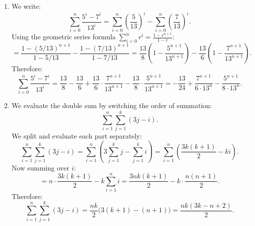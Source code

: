 \documentclass[11pt]{article}
\begin{document}
\begin{enumerate}[label=\textbf{(\alph*)}]

\item We write:
\[
    \sum_{i=0}^{n} \frac{5^i - 7^i}{13^i} = \sum_{i=0}^{n} \left(\frac{5}{13}
    \right)^i - \sum_{i=0}^{n}\left(\frac{7}{13}\right)^i.
\]
Using the geometric series formula $\sum_{i=0}^{n} r^i = \frac{1 - r^{n+1}}{1-r}$:
\[
    = \frac{1 - (5/13)^{n+1}}{1 - 5/13} - \frac{1-(7/13)^{n+1}}{1-7/13} =
    \frac{13}{8}\left(1 - \frac{5^{n+1}}{13^{n+1}}\right) - \frac{13}{6}\left(1 -
    \frac{7^{n+1}}{13^{n+1}}\right).
\]
Therefore:
\[
    \boxed{\sum_{i=0}^{n} \frac{5^i - 7^i}{13^i} = \frac{13}{8} - \frac{13}{6} +
    \frac{13}{6} \cdot \frac{7^{n+1}}{13^{n+1}} - \frac{13}{8} \cdot
    \frac{5^{n+1}}{13^{n+1}} = -\frac{13}{24} + \frac{7^{n+1}}{6 \cdot 13^n} -
    \frac{5^{n+1}}{8 \cdot 13^n}.}
\]

\item We evaluate the double sum by switching the order of summation:
\[
    \sum_{i=1}^{n}\sum_{j=1}^{k}(3j - i).
\]
We split and evaluate each part separately:
\[
    \sum_{i=1}^{n}\sum_{j=1}^{k}(3j-i) = \sum_{i=1}^{n}\left(3\sum_{j=1}^{k}j -
    \sum_{j=1}^{k}i\right) = \sum_{i=1}^{n}\left(\frac{3k(k+1)}{2} - ki\right).
\]
Now summing over $i$:
\[
    = n \cdot \frac{3k(k+1)}{2} - k\sum_{i=1}^{n}i = \frac{3nk(k+1)}{2} -
    k\cdot\frac{n(n+1)}{2}.
\]
Therefore:
\[
    \boxed{\sum_{i=1}^{n}\sum_{j=1}^{k}(3j-i) = \frac{nk}{2}\Big(3(k+1) -
    (n+1)\Big) = \frac{nk(3k - n + 2)}{2}.}
\]

\end{enumerate}
\end{document}

